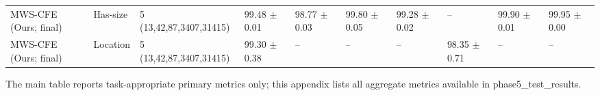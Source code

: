 \begin{table}[t]
{\begin{tabular}{llllllllll}
MWS-CFE (Ours; final) & Has-size & 5 (13,42,87,3407,31415) & 99.48 $\pm$ 0.01 & 98.77 $\pm$ 0.03 & 99.80 $\pm$ 0.05 & 99.28 $\pm$ 0.02 & -- & 99.90 $\pm$ 0.01 & 99.95 $\pm$ 0.00 \\
MWS-CFE (Ours; final) & Location & 5 (13,42,87,3407,31415) & 99.30 $\pm$ 0.38 & -- & -- & -- & 98.35 $\pm$ 0.71 & -- & -- \\
\bottomrule
\end{tabular}%
}
\vspace{0.3em}
\footnotesize{The main table reports task-appropriate primary metrics only; this appendix lists all aggregate metrics available in phase5\_test\_results.}
\end{table}

